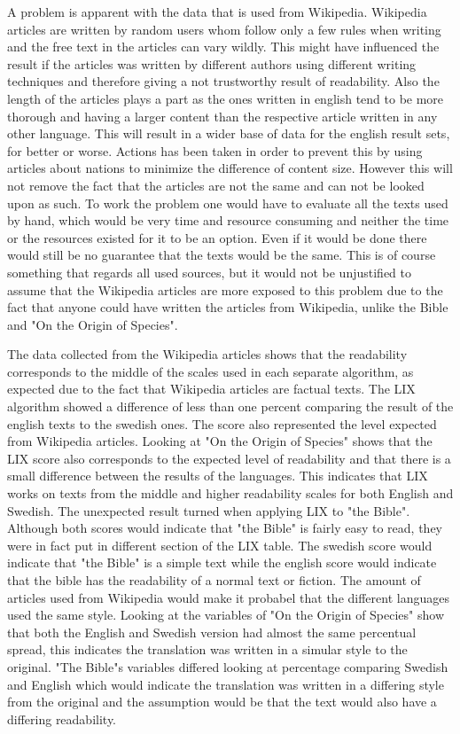 \documentclass[a4paper]{article}
\begin{document}
A problem is apparent with the data that is used from Wikipedia. Wikipedia articles are written by random users whom follow only a few rules when writing and the free text in the articles can vary wildly. This might have influenced the result if the articles was written by different authors using different writing techniques and therefore giving a not trustworthy result of readability. Also the length of the articles plays a part as the ones written in english tend to be more thorough and having a larger content than the respective article written in any other language. This will result in a wider base of data for the english result sets, for better or worse. Actions has been taken in order to prevent this by using articles about nations to minimize the difference of content size. However this will not remove the fact that the articles are not the same and can not be looked upon as such. To work the problem one would have to evaluate all the texts used by hand, which would be very time and resource consuming and neither the time or the resources existed for it to be an option. Even if it would be done there would still be no guarantee that the texts would be the same. This is of course something that regards all used sources, but it would not be unjustified to assume that the Wikipedia articles are more exposed to this problem due to the fact that anyone could have written the articles from Wikipedia, unlike the Bible and "On the Origin of Species".

The data collected from the Wikipedia articles shows that the readability corresponds to the middle of the scales used in each separate algorithm, as expected due to the fact that Wikipedia articles are factual texts. The LIX algorithm showed a difference of less than one percent comparing the result of the english texts to the swedish ones. The score also represented the level expected from Wikipedia articles. Looking at "On the Origin of Species" shows that the LIX score also corresponds to the expected level of readability and that there is a small difference between the results of the languages. This indicates that LIX works on texts from the middle and higher readability scales for both English and Swedish. The unexpected result turned when applying LIX to "the Bible". Although both scores would indicate that "the Bible" is fairly easy to read, they were in fact put in different section of the LIX table. The swedish score would indicate that "the Bible" is a simple text while the english score would indicate that the bible has the readability of a normal text or fiction. The amount of articles used from Wikipedia would make it probabel that the different languages used the same style. Looking at the variables of "On the Origin of Species" show that both the English and Swedish version had almost the same percentual spread, this indicates the translation was written in a simular style to the original. "The Bible"s variables differed looking at percentage comparing Swedish and English which would indicate the translation was written in a differing style from the original and the assumption would be that the text would also have a differing readability.
\end{document}
